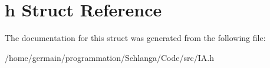\hypertarget{struct_i_a_1_1h}{\section{h Struct Reference}
\label{struct_i_a_1_1h}
}


The documentation for this struct was generated from the following file\-:\begin{DoxyCompactItemize}
\item 
/home/germain/programmation/\-Schlanga/\-Code/src/I\-A.\-h\end{DoxyCompactItemize}
